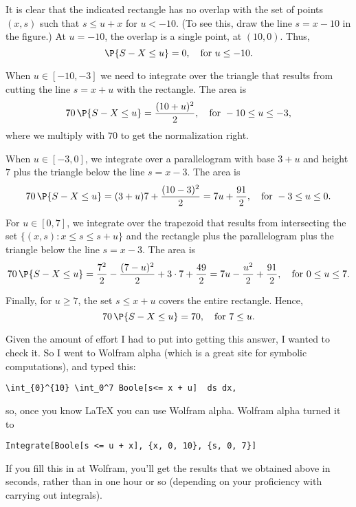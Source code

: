 \begin{exercise}
\begin{solution}
It is clear that  the indicated rectangle has no overlap with the set of points $(x,s)$ such that $s\leq u + x$ for $u<-10$. (To see this, draw the line $s=x-10$ in the figure.) At $u=-10$, the overlap is a single point, at $(10,0)$. Thus, 
\begin{equation*}
\P{S-X \leq u}=0, \quad \text{for } u\leq -10.
\end{equation*}

When $u\in[-10, -3]$ we need to integrate over the triangle that results from cutting the line $s=x+u$ with the rectangle. The area is 
\begin{equation*}
70\, \P{S-X \leq u}= \frac{(10+u)^2}2, \quad \text{for } -10 \leq u\leq -3,
\end{equation*}
where we multiply with $70$ to get the normalization right. 

When $u\in[-3, 0]$, we integrate over a parallelogram with base $3+u$ and height $7$ plus the triangle below the line $s=x-3$. The area is 
\begin{equation*}
70\, \P{S-X \leq u}= (3+u)7 + \frac{(10-3)^2}2=7u + \frac{91}2, \quad \text{for } -3 \leq u\leq 0.
\end{equation*}

For $u\in[0, 7]$, we integrate over the trapezoid that results from intersecting the set $\{(x,s) : x \leq s \leq s + u\}$ and the rectangle plus the parallelogram plus the triangle below the line $s=x-3$. The area is 
\begin{equation*}
70\, \P{S-X \leq u}=  \frac{7^2}2 - \frac{(7-u)^2}{2} + 3\cdot 7 + \frac{49}2 = 7 u - \frac{u^2}2 + \frac{91}2, \quad \text{for } 0\leq u\leq 7.
\end{equation*}

Finally, for $u\geq 7$, the set $s\leq x+u$ covers the entire rectangle. Hence, 
\begin{equation*}
70\, \P{S-X \leq u}=  70, \quad \text{for } 7\leq u.
\end{equation*}

Given the amount of effort I had to put into getting this answer, I wanted to check it. So I went to  Wolfram alpha (which is a great site for symbolic computations), and typed this: 
\begin{verbatim}
\int_{0}^{10} \int_0^7 Boole[s<= x + u]  ds dx,
\end{verbatim}
so, once you know \LaTeX\/ you can use Wolfram alpha.  Wolfram alpha turned it to 
\begin{verbatim}
Integrate[Boole[s <= u + x], {x, 0, 10}, {s, 0, 7}]
\end{verbatim}
If you fill this in at Wolfram, you'll get the results that we obtained above in seconds, rather than in one hour or so (depending on your proficiency with carrying out integrals).
\end{solution}
\end{exercise}



